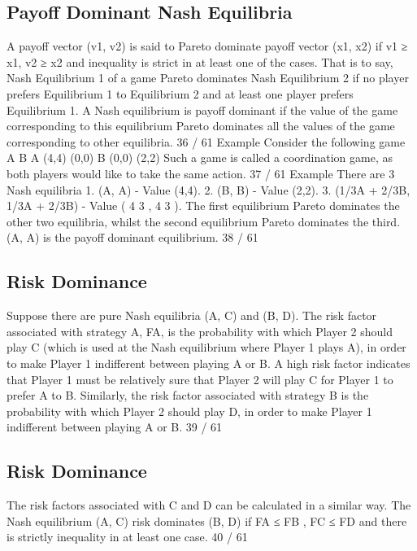 \documentclass[]{report}
\begin{document}
\subsection{Payoff Dominant Nash Equilibria}
A payoff vector (v1, v2) is said to Pareto dominate payoff vector
(x1, x2) if v1 ≥ x1, v2 ≥ x2 and inequality is strict in at least one of
the cases.
That is to say, Nash Equilibrium 1 of a game Pareto dominates
Nash Equilibrium 2 if no player prefers Equilibrium 1 to Equilibrium
2 and at least one player prefers Equilibrium 1.
A Nash equilibrium is payoff dominant if the value of the game
corresponding to this equilibrium Pareto dominates all the values
of the game corresponding to other equilibria.
36 / 61
Example
Consider the following game
A B
A (4,4) (0,0)
B (0,0) (2,2)
Such a game is called a coordination game, as both players would
like to take the same action.
37 / 61
Example
There are 3 Nash equilibria
1. (A, A) - Value (4,4).
2. (B, B) - Value (2,2).
3. (1/3A + 2/3B, 1/3A + 2/3B) - Value ( 4
3
,
4
3
).
The first equilibrium Pareto dominates the other two equilibria,
whilst the second equilibrium Pareto dominates the third.
(A, A) is the payoff dominant equilibrium.
38 / 61
\subsection{Risk Dominance}
Suppose there are pure Nash equilibria (A, C) and (B, D).
The risk factor associated with strategy A, FA, is the probability
with which Player 2 should play C (which is used at the Nash
equilibrium where Player 1 plays A), in order to make Player 1
indifferent between playing A or B.
A high risk factor indicates that Player 1 must be relatively sure
that Player 2 will play C for Player 1 to prefer A to B.
Similarly, the risk factor associated with strategy B is the
probability with which Player 2 should play D, in order to make
Player 1 indifferent between playing A or B.
39 / 61
\subsection{Risk Dominance}
The risk factors associated with C and D can be calculated in a
similar way.
The Nash equilibrium (A, C) risk dominates (B, D) if FA ≤ FB ,
FC ≤ FD and there is strictly inequality in at least one case.
40 / 61
\end{document}

